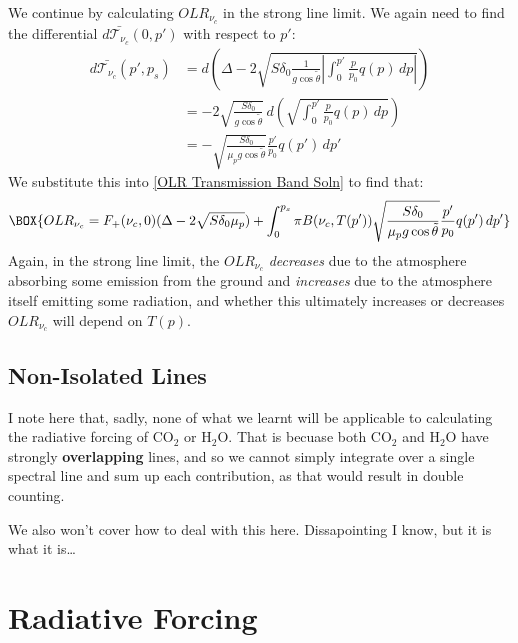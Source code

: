 We continue by calculating $OLR_{\nu_c}$ in the strong line limit. We again need to find the differential $d\bar{\mathcal{T}_{\nu_c}}(0,p')$ with respect to $p'$:
\begin{align*}
    d\bar{\mathcal{T}_{\nu_c}}(p',p_s)&=d\left( 
        \Delta - 2\sqrt{S\delta_0\frac{1}{g\cos\tilde{\theta}}\left|
            \int_{0}^{p'}\frac{p}{p_0}q(p)\,dp
        \right|}
     \right)\\
     &= -2\sqrt{\frac{S\delta_0}{g\cos\tilde{\theta}}}\,d\left( 
        \sqrt{\int_{0}^{p'}\frac{p}{p_0}q(p)\,dp}
      \right)
     \\
     &= -\sqrt{\frac{S\delta_0}{\mu_pg\cos\tilde{\theta}}}\frac{p'}{p_0}q(p')\,dp'
\end{align*}
We substitute this into \ref{OLR Transmission Band Soln} to find that:
\begin{align}
    \label{Strong OLR}
    \BOX{OLR_{\nu_c}
    =F_+(\nu_c,0)(\Delta-2\sqrt{S\delta_0 \mu_p})+\int_{0}^{p_s}\pi B(\nu_c,T(p'))\sqrt{\frac{S\delta_0}{\mu_pg\cos\tilde{\theta}}}\frac{p'}{p_0}q(p')\,dp'}
\end{align}
Again, in the strong line limit, the $OLR_{\nu_c}$ \textit{decreases} due to the atmosphere absorbing some emission from the ground and \textit{increases} due to the atmosphere itself emitting some radiation, and whether this ultimately increases or decreases $OLR_{\nu_c}$ will depend on $T(p)$.

\subsection{Non-Isolated Lines}

I note here that, sadly, none of what we learnt will be applicable to calculating the radiative forcing of CO$_2$ or H$_2$O. That is becuase both CO$_2$ and H$_2$O have strongly \textbf{overlapping} lines, and so we cannot simply integrate over a single spectral line and sum up each contribution, as that would result in double counting.

We also won't cover how to deal with this here. Dissapointing I know, but it is what it is\ldots

\section{Radiative Forcing}

